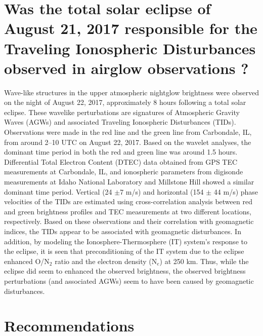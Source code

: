 \documentclass[crop=false,class=mitthesis,oneside,font=12pt]{standalone}
\begin{document}
\section{Was the total solar eclipse of August 21, 2017 responsible for the Traveling Ionospheric Disturbances observed in airglow observations ?}
Wave-like structures in the upper atmospheric nightglow brightness were observed on the night of August 22, 2017, approximately 8 hours following a total solar eclipse. These wavelike perturbations are signatures of  Atmospheric Gravity Waves (AGWs) and associated Traveling Ionospheric Disturbances (TIDs). Observations were made in the red line and the green line from Carbondale, IL, from around 2--10 UTC on August 22, 2017. Based on the wavelet analyses, the dominant time period in both the red and green line was around 1.5 hours. Differential Total Electron Content (DTEC) data obtained from GPS TEC measurements at Carbondale, IL, and ionospheric parameters from digisonde measurements at Idaho National Laboratory and Millstone Hill showed a similar dominant time period. Vertical (24 $\pm$7 m/s) and horizontal (154 $\pm$ 44 m/s) phase velocities of the TIDs are estimated using cross-correlation analysis between red and green brightness profiles and TEC measurements at two different locations, respectively. Based on these observations and their correlation with geomagnetic indices, the TIDs appear to be associated with geomagnetic disturbances. In addition, by modeling the Ionosphere-Thermosphere (IT) system's response to the eclipse, it is seen that preconditioning of the IT system due to the eclipse enhanced O/N$_2$ ratio and the electron density (N$_e$) at 250 km. Thus, while the eclipse did seem to enhanced the observed brightness, the observed brightness perturbations (and associated AGWs) seem to have been caused by geomagnetic disturbances.


\section{Recommendations} \label{sec:recommendations}
\end{document}
